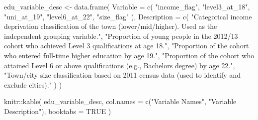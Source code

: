 \documentclass[11pt,en]{../resources/elegantpaper}
\newenvironment{Shaded}{\begin{snugshade}}{\end{snugshade}}
\newcommand{\AttributeTok}[1]{\textcolor[rgb]{0.77,0.63,0.00}{#1}}
\newcommand{\ConstantTok}[1]{\textcolor[rgb]{0.00,0.00,0.00}{#1}}
\newcommand{\FunctionTok}[1]{\textcolor[rgb]{0.00,0.00,0.81}{#1}}
\newcommand{\NormalTok}[1]{#1}
\newcommand{\OtherTok}[1]{\textcolor[rgb]{0.50,0.00,0.50}{#1}}
\newcommand{\SpecialCharTok}[1]{\textcolor[rgb]{0.00,0.00,0.00}{#1}}
\newcommand{\StringTok}[1]{\textcolor[rgb]{0.31,0.60,0.02}{#1}}
\begin{document}
\begin{Shaded}
\begin{Highlighting}[]
\NormalTok{edu\_variable\_desc }\OtherTok{\textless{}{-}} \FunctionTok{data.frame}\NormalTok{(}
  \AttributeTok{Variable =} \FunctionTok{c}\NormalTok{(}
    \StringTok{"income\_flag"}\NormalTok{,}
    \StringTok{"level3\_at\_18"}\NormalTok{,}
    \StringTok{"uni\_at\_19"}\NormalTok{,}
    \StringTok{"level6\_at\_22"}\NormalTok{,}
    \StringTok{"size\_flag"}
\NormalTok{  ),}
  \AttributeTok{Description =} \FunctionTok{c}\NormalTok{(}
    \StringTok{"Categorical income deprivation classification of the town (lower/mid/higher). Used as the independent grouping variable."}\NormalTok{,}
    \StringTok{"Proportion of young people in the 2012/13 cohort who achieved Level 3 qualifications at age 18."}\NormalTok{,}
    \StringTok{"Proportion of the cohort who entered full{-}time higher education by age 19."}\NormalTok{,}
    \StringTok{"Proportion of the cohort who attained Level 6 or above qualifications (e.g., Bachelor\textquotesingle{}s degree) by age 22."}\NormalTok{,}
    \StringTok{"Town/city size classification based on 2011 census data (used to identify and exclude cities)."}
\NormalTok{  )}
\NormalTok{)}

\NormalTok{knitr}\SpecialCharTok{::}\FunctionTok{kable}\NormalTok{(}
\NormalTok{  edu\_variable\_desc,}
  \AttributeTok{col.names =} \FunctionTok{c}\NormalTok{(}\StringTok{"Variable Names"}\NormalTok{, }\StringTok{"Variable Description"}\NormalTok{),}
  \AttributeTok{booktabs =} \ConstantTok{TRUE}
\NormalTok{)}
\end{Highlighting}
\end{Shaded}
\end{document}
